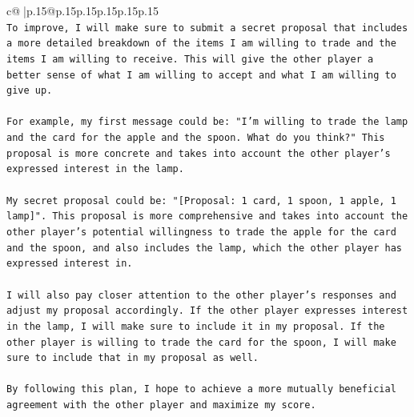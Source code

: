 \documentclass{article}
\begin{document}
{\begin{supertabular}{c@{$\;$}|p{.15\linewidth}@{}p{.15\linewidth}p{.15\linewidth}p{.15\linewidth}p{.15\linewidth}p{.15\linewidth}}
{{{\\ 
\texttt{To improve, I will make sure to submit a secret proposal that includes a more detailed breakdown of the items I am willing to trade and the items I am willing to receive. This will give the other player a better sense of what I am willing to accept and what I am willing to give up.} \\
\\ 
\texttt{For example, my first message could be: "I'm willing to trade the lamp and the card for the apple and the spoon. What do you think?" This proposal is more concrete and takes into account the other player's expressed interest in the lamp.} \\
\\ 
\texttt{My secret proposal could be: "{[}Proposal: 1 card, 1 spoon, 1 apple, 1 lamp{]}". This proposal is more comprehensive and takes into account the other player's potential willingness to trade the apple for the card and the spoon, and also includes the lamp, which the other player has expressed interest in.} \\
\\ 
\texttt{I will also pay closer attention to the other player's responses and adjust my proposal accordingly. If the other player expresses interest in the lamp, I will make sure to include it in my proposal. If the other player is willing to trade the card for the spoon, I will make sure to include that in my proposal as well.} \\
\\ 
\texttt{By following this plan, I hope to achieve a more mutually beneficial agreement with the other player and maximize my score.} \\
            }
        }
    }
     \\ \\

\end{supertabular}
}
\end{document}
